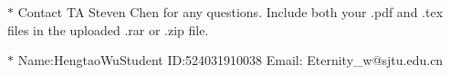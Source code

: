 \documentclass[12pt,a4paper]{article}
\theoremstyle{definition}
\begin{document}
\noindent

\noindent{}
\begin{center}
\footnotesize{\color{red}$*$ Contact TA Steven Chen for any questions. Include both your .pdf and .tex files in the uploaded .rar or .zip file.}

\footnotesize{\color{blue}$*$ Name:HengtaoWu\quad Student ID:524031910038 \quad Email: Eternity\_w@sjtu.edu.cn}
\end{center}
\end{document}
